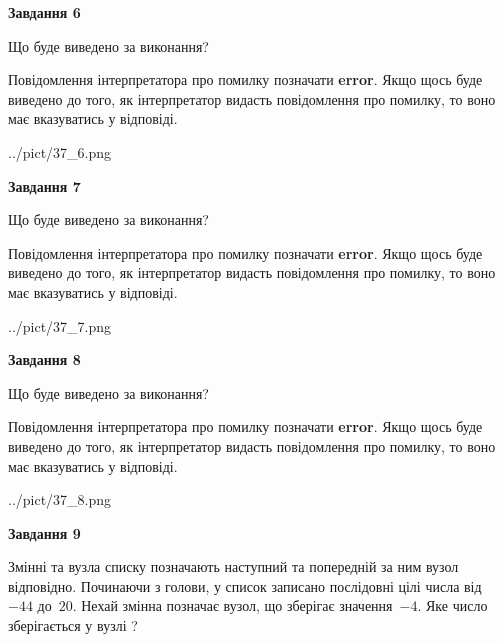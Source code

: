 \documentclass[12pt, ukrainian]{article}
\begin{document}
{\begin {large}
{\begin {center}\textbf{Завдання 6}\end {center}}\par
Що буде виведено за виконання?

Повідомлення інтерпретатора про помилку позначати \textbf{error}.
Якщо щось буде виведено до того, як інтерпретатор видасть повідомлення про помилку, 
то воно має вказуватись у відповіді. \par


\begin{center}
	{../pict/37_6.png}
\end{center}
\newpage

{\begin {center}\textbf{Завдання 7}\end {center}}\par
Що буде виведено за виконання?

Повідомлення інтерпретатора про помилку позначати \textbf{error}.
Якщо щось буде виведено до того, як інтерпретатор видасть повідомлення про помилку, 
то воно має вказуватись у відповіді. \par


\begin{center}
	{../pict/37_7.png}
\end{center}
\newpage

{\begin {center}\textbf{Завдання 8}\end {center}}\par
Що буде виведено за виконання?

Повідомлення інтерпретатора про помилку позначати \textbf{error}.
Якщо щось буде виведено до того, як інтерпретатор видасть повідомлення про помилку, 
то воно має вказуватись у відповіді. \par


\begin{center}
	{../pict/37_8.png}
\end{center}
\newpage

{\begin {center}\textbf{Завдання 9}\end {center}}\par
Змінні  та  вузла списку позначають наступний та попередній за ним вузол відповідно. Починаючи з голови, у список записано послідовні цілі числа від~$-44$ до~$20$. Нехай змінна  позначає вузол, що зберігає значення~$-4$.
Яке число зберігається у вузлі  ?\par
\newpage


\end{large}}
\end{document}
